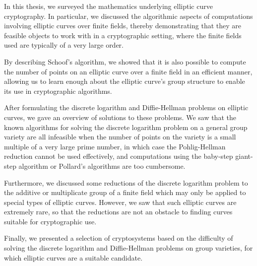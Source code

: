 In this thesis, we surveyed the mathematics underlying elliptic curve cryptography. In particular, we discussed the algorithmic aspects of computations involving elliptic curves over finite fields, thereby demonstrating that they are feasible objects to work with in a cryptographic setting, where the finite fields used are typically of a very large order.

By describing Schoof's algorithm, we showed that it is also possible to compute the number of points on an elliptic curve over a finite field in an efficient manner, allowing us to learn enough about the elliptic curve's group structure to enable its use in cryptographic algorithms.

After formulating the discrete logarithm and Diffie-Hellman problems on elliptic curves, we gave an overview of solutions to these problems. We saw that the known algorithms for solving the discrete logarithm problem on a general group variety are all infeasible when the number of points on the variety is a small multiple of a very large prime number, in which case the Pohlig-Hellman reduction cannot be used effectively, and computations using the baby-step giant-step algorithm or Pollard's algorithms are too cumbersome.

Furthermore, we discussed some reductions of the discrete logarithm problem to the additive or multiplicate group of a finite field which may only be applied to special types of elliptic curves. However, we saw that such elliptic curves are extremely rare, so that the reductions are not an obstacle to finding curves suitable for cryptographic use.

Finally, we presented a selection of cryptosystems based on the difficulty of solving the discrete logarithm and Diffie-Hellman problems on group varieties, for which elliptic curves are a suitable candidate.
